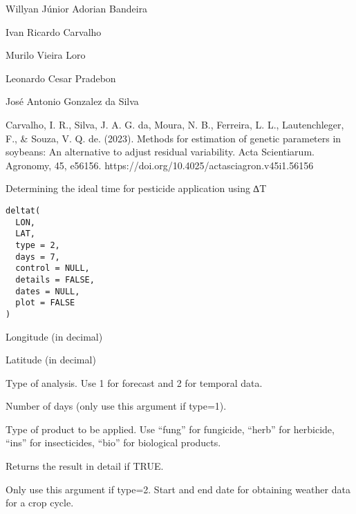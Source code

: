\documentclass[a4paper]{book}
\begin{document}
%
\begin{Author}
Willyan Júnior Adorian Bandeira

Ivan Ricardo Carvalho

Murilo Vieira Loro

Leonardo Cesar Pradebon

José Antonio Gonzalez da Silva
\end{Author}
%
\begin{References}
Carvalho, I. R., Silva, J. A. G. da, Moura, N. B., Ferreira, L. L.,
Lautenchleger, F., \& Souza, V. Q. de. (2023). Methods for estimation of
genetic parameters in soybeans: An alternative to adjust residual variability.
Acta Scientiarum. Agronomy, 45, e56156.
https://doi.org/10.4025/actasciagron.v45i1.56156
\end{References}
%
\begin{Description}
Determining the ideal time for pesticide application using ∆T
\end{Description}
%
\begin{Usage}
\begin{verbatim}
deltat(
  LON,
  LAT,
  type = 2,
  days = 7,
  control = NULL,
  details = FALSE,
  dates = NULL,
  plot = FALSE
)
\end{verbatim}
\end{Usage}
%
\begin{Arguments}
\begin{ldescription}
\item[\code{LON}] Longitude (in decimal)

\item[\code{LAT}] Latitude (in decimal)

\item[\code{type}] Type of analysis. Use 1 for forecast and 2 for temporal data.

\item[\code{days}] Number of days (only use this argument if type=1).

\item[\code{control}] Type of product to be applied. Use “fung” for fungicide,
“herb” for herbicide, “ins” for insecticides, “bio” for biological products.

\item[\code{details}] Returns the result in detail if TRUE.

\item[\code{dates}] Only use this argument if type=2. Start and end date for obtaining
weather data for a crop cycle.
\end{ldescription}
\end{Arguments}
\end{document}
